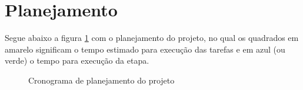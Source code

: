 \section{Planejamento}
Segue abaixo a figura \ref{fig::crono} com o planejamento do projeto, no qual os
quadrados em amarelo significam o tempo estimado para execução das tarefas e em azul (ou verde) o
tempo para execução da etapa.
\begin{figure}[H]
\centering
{}
\caption{Cronograma de planejamento do projeto}
\label{fig::crono}
\end{figure}


